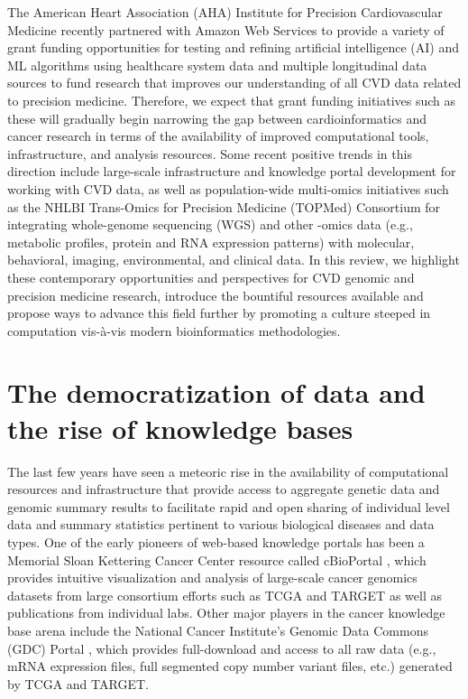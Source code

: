 \documentclass[letter]{bioinfo}
\begin{document}
The American Heart Association (AHA) Institute for Precision Cardiovascular Medicine recently partnered with Amazon Web Services to provide a variety of grant funding opportunities for testing and refining artificial intelligence (AI) and ML algorithms using healthcare system data and multiple longitudinal data sources to fund research that improves our understanding of all CVD data related to precision medicine.  Therefore, we expect that grant funding initiatives such as these will gradually begin narrowing the gap between cardioinformatics and cancer research in terms of the availability of improved computational tools, infrastructure, and analysis resources.  Some recent positive trends in this direction include large-scale infrastructure and knowledge portal development \citep{Kass-Hout:2018:American, Khomtchouk:2018:HeartBioPortal, Broad:NA:Cardiovascular, Broad:NA:Cerebrovascular} for working with CVD data, as well as population-wide multi-omics initiatives such as the NHLBI Trans-Omics for Precision Medicine (TOPMed) Consortium \citep{NHLBI:2014:TransOmics} for integrating whole-genome sequencing (WGS) and other -omics data (e.g., metabolic profiles, protein and RNA expression patterns) with molecular, behavioral, imaging, environmental, and clinical data.  In this review, we highlight these contemporary opportunities and perspectives for CVD genomic and precision medicine research, introduce the bountiful resources available and propose ways to advance this field further by promoting a culture steeped in computation vis-\`{a}-vis modern bioinformatics methodologies.


\section*{The democratization of data and the rise of knowledge bases}

The last few years have seen a meteoric rise in the availability of computational resources and infrastructure that provide access to aggregate genetic data and genomic summary results to facilitate rapid and open sharing of individual level data and summary statistics pertinent to various biological diseases and data types.  One of the early pioneers of web-based knowledge portals has been a Memorial Sloan Kettering Cancer Center resource called cBioPortal \citep{Cerami:2012:cBio,Gao:2013:Integrative}, which provides intuitive visualization and analysis of large-scale cancer genomics datasets from large consortium efforts such as TCGA \citep{TCGA:2013:Cancer} and TARGET \citep{Koscielny:2017:Open} as well as publications from individual labs.  Other major players in the cancer knowledge base arena include the National Cancer Institute's Genomic Data Commons (GDC) Portal \citep{Grossman:2016:Shared,Jensen:2017:NCI}, which provides full-download and access to all raw data (e.g., mRNA expression files, full segmented copy number variant files, etc.) generated by TCGA and TARGET.
	
\end{document}
